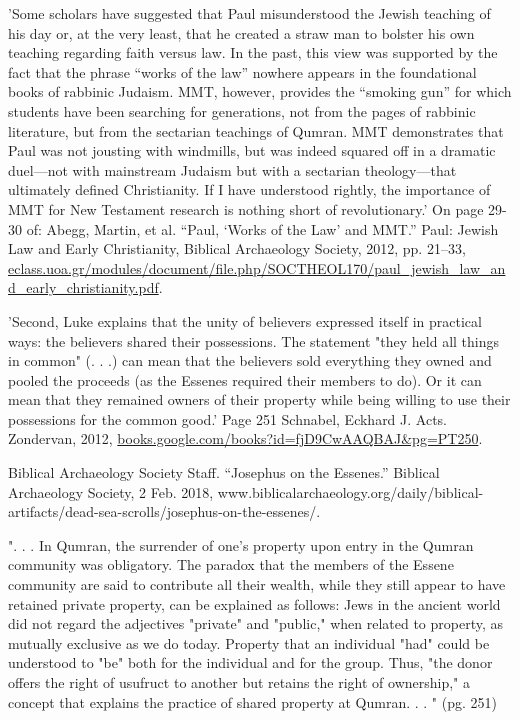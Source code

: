\documentclass[11pt]{article}
\begin{document}
\begin{thebibliography}{37}
'Some scholars have suggested that Paul misunderstood the Jewish
teaching of his day or, at the very least, that he created a straw man to bolster
his own teaching regarding faith versus law. In the past, this view was supported
by the fact that the phrase “works of the law” nowhere appears in the foundational books of rabbinic Judaism. MMT, however, provides the “smoking
gun” for which students have been searching for generations, not from the pages
of rabbinic literature, but from the sectarian teachings of Qumran. MMT
demonstrates that Paul was not jousting with windmills, but was indeed squared
off in a dramatic duel—not with mainstream Judaism but with a sectarian
theology—that ultimately defined Christianity. If I have understood rightly, the
importance of MMT for New Testament research is nothing short of revolutionary.'
On page 29-30 of:
Abegg, Martin, et al. “Paul, ‘Works of the Law’ and MMT.” Paul: Jewish Law and Early Christianity, Biblical Archaeology Society, 2012, pp. 21–33, \url{eclass.uoa.gr/modules/document/file.php/SOCTHEOL170/paul_jewish_law_and_early_christianity.pdf}.

'Second, Luke explains that the unity of believers expressed itself in practical ways: the believers shared their possessions. The statement "they held all things in common" (. . .) can mean that the believers sold everything they owned and pooled the proceeds (as the Essenes required their members to do). Or it can mean that they remained owners of their property while being willing to use their possessions for the common good.' 
Page 251
Schnabel, Eckhard J. Acts. Zondervan, 2012, \url{books.google.com/books?id=fjD9CwAAQBAJ&pg=PT250}.

Biblical Archaeology Society Staff. “Josephus on the Essenes.” Biblical Archaeology Society, 2 Feb. 2018, www.biblicalarchaeology.org/daily/biblical-artifacts/dead-sea-scrolls/josephus-on-the-essenes/.



". . . In Qumran, the surrender of one's property upon entry in the Qumran community was obligatory. The paradox that the members of the Essene community are said to contribute all their wealth, while they still appear to have retained private property, can be explained as follows: Jews in the ancient world did not regard the adjectives "private" and "public," when related to property, as mutually exclusive as we do today. Property that an individual "had" could be understood to "be" both for the individual and for the group. Thus, "the donor offers the right of usufruct to another but retains the right of ownership," a concept that explains the practice of shared property at Qumran. . . "
(pg. 251)


\end{thebibliography}
\end{document}

